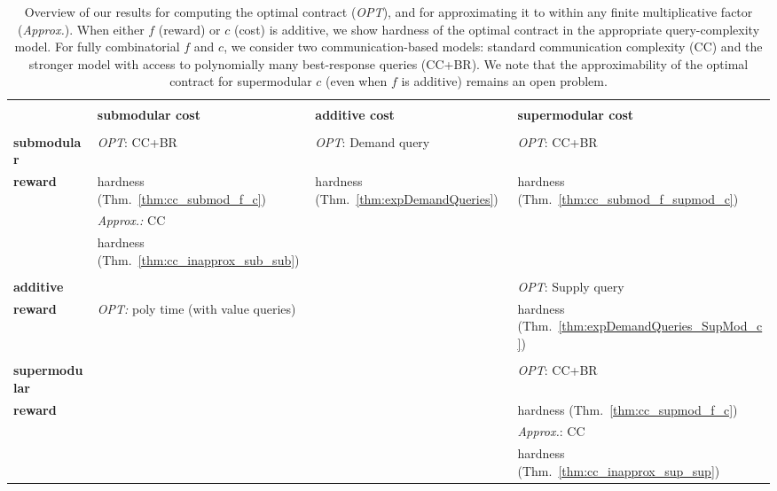 \documentclass[11pt]{article}
\begin{document}
\begin{table}[t]
  \centering
  \begin{tabular}{|p{2.7cm}|p{4cm}|p{4cm}|p{4cm}|}
    \hline
    & & & \\[-.8em]
    & \textbf{submodular cost} & \textbf{additive cost} & \textbf{supermodular cost} 
    \\[0.3em]
    \hline  
    & & & \\[-.8em]
    \textbf{submodular} & \textit{OPT}: CC+BR & \textit{OPT}: Demand query & \textit{OPT}: CC+BR \\
    \textbf{reward} &  hardness (Thm.\ \ref{thm:cc_submod_f_c}) & hardness (Thm.\ \ref{thm:expDemandQueries}) & hardness (Thm.\ \ref{thm:cc_submod_f_supmod_c}) \\[0.3em]
    & \textit{Approx.:} CC &  &  \\
    & hardness (Thm.\ \ref{thm:cc_inapprox_sub_sub}) &  &  \\
    \hline  
    & \multicolumn{2}{|p{3.8cm}|}{} & \\[-.8em] 
    \textbf{additive} & \multicolumn{2}{|p{3.8cm}|}{} & \textit{OPT}: Supply query \\
    \textbf{reward} & \multicolumn{2}{|p{3.8cm}|}{\multirow{5}{*}{\textit{OPT:} poly time (with value queries) \cite{dutting2024combinatorial}}} & hardness (Thm.\ \ref{thm:expDemandQueries_SupMod_c}) \\[0.3em]
    \cline{1-1}\cline{4-4}  
    & \multicolumn{2}{|p{3.8cm}|}{} & \\[-.8em] 
    \textbf{supermodular} & \multicolumn{2}{|p{3.8cm}|}{} & \textit{OPT}: CC+BR \\
    \textbf{reward} & \multicolumn{2}{|p{3.8cm}|}{} & hardness (Thm.\ \ref{thm:cc_supmod_f_c}) \\[0.3em]
    & \multicolumn{2}{|p{3.8cm}|}{} & \textit{Approx.}: CC \\
    & \multicolumn{2}{|p{3.8cm}|}{} & hardness (Thm.\ \ref{thm:cc_inapprox_sup_sup}) \\
    \hline
  \end{tabular}
  \caption{Overview of our results for computing the optimal contract (\textit{OPT}), 
  and for approximating it to within any finite multiplicative factor (\textit{Approx.}). 
    When either $f$ (reward) or $c$ (cost) is additive, we show hardness of the optimal contract in the appropriate query-complexity model.
  For fully combinatorial $f$ and $c$, we consider two communication-based models:
  standard communication complexity ({CC}) and the stronger model with access to polynomially many best-response queries ({CC+BR}).
  We note that the approximability of the optimal contract for supermodular $c$ (even when $f$ is additive) remains an open problem.
  } 
  \label{tab:overview}
\end{table}
\end{document}

